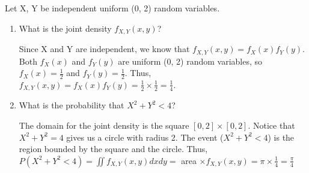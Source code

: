 \question Let X, Y be independent uniform (0, 2) random variables. 

\begin{enumerate}[label=(\alph*)] 
\item What is the joint density $f_{X, Y}(x, y)$? 
\begin{solution}[4cm] 
Since X and Y are independent, we know that $f_{X, Y}(x, y) = f_X(x) f_Y(y)$. \\ 
Both $f_X(x)$ and $f_Y(y)$ are uniform (0, 2) random variables, so $f_X(x) = \frac{1}{2}$ and $f_Y(y) = \frac{1}{2}$. Thus, $f_{X, Y}(x, y) = f_X(x) f_Y(y) =  \frac{1}{2} \times \frac{1}{2} =  \frac{1}{4}$. 
\end{solution}

\item What is the probability that $X^2 + Y^2 < 4$? 
\begin{solution}[4cm]
The domain for the joint density is the square $[0, 2] \times [0, 2]$. Notice that $X^2 + Y^2 = 4$ gives us a circle with radius 2. The event ($X^2 + Y^2 < 4$) is the region bounded by the square and the circle. Thus, $P(X^2 + Y^2 < 4) = \iint f_{X, Y} (x, y) dx dy =$ area $\times f_{X, Y} (x, y) = \pi \times \frac{1}{4} = \frac{\pi}{4}$ 
\end{solution}
\end{enumerate}
